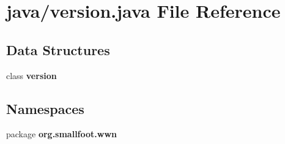 \section{java/version.java \-File \-Reference}
\label{version_8java}
\subsection*{\-Data \-Structures}
\begin{DoxyCompactItemize}
\item 
class {\bf version}
\end{DoxyCompactItemize}
\subsection*{\-Namespaces}
\begin{DoxyCompactItemize}
\item 
package {\bf org.\-smallfoot.\-wwn}
\end{DoxyCompactItemize}
